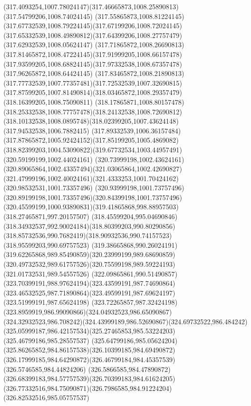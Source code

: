 {    \curveto(317.4093254,1007.78024147)(317.46665873,1008.25890813)(317.54799206,1008.74024145)
    \curveto(317.55865873,1008.81224145)(317.67732539,1008.79224145)(317.67199206,1008.72024145)
    \curveto(317.65332539,1008.49890812)(317.64399206,1008.27757479)(317.62932539,1008.05624147)
    \curveto(317.71865872,1008.26690813)(317.81465872,1008.47224145)(317.91999205,1008.66157478)
    \curveto(317.93599205,1008.68824145)(317.97332538,1008.67357478)(317.96265872,1008.64424145)
    \curveto(317.83465872,1008.21890813)(317.77732539,1007.77357481)(317.72532539,1007.32690815)
    \curveto(317.87599205,1007.81490814)(318.03465872,1008.29357479)(318.16399205,1008.75090811)
    \curveto(318.17865871,1008.80157478)(318.25332538,1008.77757478)(318.24132538,1008.72690812)
    \curveto(318.10132538,1008.0895748)(318.02399205,1007.43624148)(317.94532538,1006.7882415)
    \curveto(317.89332539,1006.36157484)(317.87865872,1005.92424152)(317.85199205,1005.4869082)
    \curveto(318.82399203,1004.53090822)(319.67732534,1003.44957491)(320.59199199,1002.44024161)
    \curveto(320.73999198,1002.43624161)(320.89065864,1002.43357494)(321.03065864,1002.42690827)
    \curveto(321.47999196,1002.40024161)(321.4333253,1001.70424162)(320.98532531,1001.73357496)
    \curveto(320.93999198,1001.73757496)(320.89199198,1001.73357496)(320.84399198,1001.73757496)
    \curveto(320.45599199,1000.93890831)(319.41865868,998.88957503)(318.27465871,997.20157507)
    \curveto(318.45599204,995.04690846)(318.34932537,992.90024184)(318.80399203,990.80290856)
    \curveto(318.85732536,990.7682419)(318.90932536,990.74157523)(318.95599203,990.69757523)
    \curveto(319.38665868,990.26024191)(319.62265868,989.85490859)(320.23999199,989.68690859)
    \curveto(320.49732532,989.61757526)(320.75599198,989.59224193)(321.01732531,989.54557526)
    \curveto(322.09865861,990.51490857)(323.70399191,988.97624194)(323.43599191,987.74690864)
    \curveto(323.46532525,987.71890864)(323.49599191,987.69624197)(323.51999191,987.65624198)
    \curveto(323.72265857,987.32424198)(323.8959919,986.99090866)(324.04932523,986.65090867)
    \curveto(324.32932523,986.708242)(324.43999189,986.52690867)(324.69732522,986.484242)
    \curveto(325.05999187,986.42157534)(325.27465853,985.53224203)(325.46799186,985.28557537)
    \curveto(325.64799186,985.05624204)(325.86265852,984.86157538)(326.10399185,984.69490872)
    \curveto(326.17999185,984.64290872)(326.46799184,984.45357539)(326.5746585,984.44824206)
    \curveto(326.5866585,984.47890872)(326.68399183,984.57757539)(326.70399183,984.61624205)
    \curveto(326.77332516,984.75090871)(326.7986585,984.91224204)(326.82532516,985.05757537)
}
